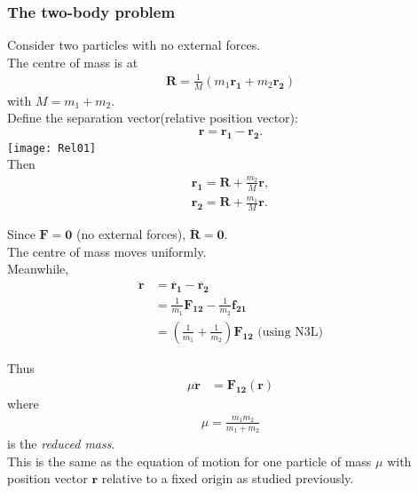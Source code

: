 \documentclass[a4paper]{article}
\begin{document}
\subsubsection{The two-body problem}
Consider two particles with no external forces.\\
The centre of mass is at \\
\begin{equation*}
\begin{aligned}
\mathbf{R} = \frac{1}{M}\left(m_{1}\mathbf{r_{1}}+m_{2}\mathbf{r_{2}}\right)
\end{aligned}
\end{equation*}
with $M=m_{1}+m_{2}$.\\
Define the separation vector(relative position vector):\\
\begin{equation*}
\begin{aligned}
\mathbf{r} = \mathbf{r_{1}}-\mathbf{r_{2}}.
\end{aligned}
\end{equation*}
\texttt{[image: Rel01]}\\
Then 
\begin{equation*}
\begin{aligned}
\mathbf{r_{1}} = \mathbf{R} + \frac{m_{2}}{M}\mathbf{r},\\
\mathbf{r_{2}} = \mathbf{R} + \frac{m_{1}}{M}\mathbf{r}.
\end{aligned}
\end{equation*}

Since $\mathbf{F}=\mathbf{0}$ (no external forces), $\ddot{\mathbf{R}} = \mathbf{0}$.\\
The centre of mass moves uniformly.\\
Meanwhile,
\begin{equation*}
\begin{aligned}
\ddot{\mathbf{r}} &= \ddot{\mathbf{r_{1}}} - \ddot{\mathbf{r_{2}}}\\
&= \frac{1}{m_{1}} \mathbf{F_{12}} - \frac{1}{m_{2}} \mathbf{f_{21}}\\
&= \left(\frac{1}{m_{1}}+\frac{1}{m_{2}}\right)\mathbf{F_{12}} \text{ (using N3L)}
\end{aligned}
\end{equation*}

Thus
\begin{equation*}
\begin{aligned}
\mu \ddot{\mathbf{r}} &= \mathbf{F_{12}}\left(\mathbf{r}\right)
\end{aligned}
\end{equation*}
where 
\begin{equation*}
\begin{aligned}
\mu = \frac{m_{1}m_{2}}{m_{1}+m_{2}}
\end{aligned}
\end{equation*}
is the \emph{reduced mass}.\\
This is the same as the equation of motion for one particle of mass $\mu$ with position vector $\mathbf{r}$ relative to a fixed origin as studied previously.\\
\end{document}
